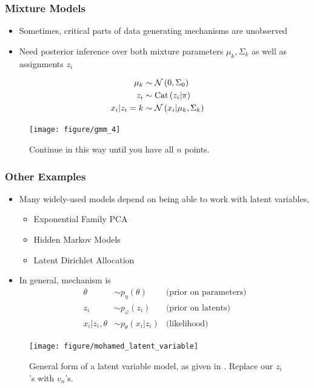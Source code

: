 \documentclass[10pt,mathserif]{beamer}
\begin{document}
\label{sec:latent_variable_models}
\begin{frame}
  \frametitle{Mixture Models}
  \begin{itemize}
  \item Sometimes, critical parts of data generating mechanisms are unobserved
    \item Need posterior inference over both mixture parameters $\mu_k,
      \Sigma_k$ as well as assignments $z_i$
  \end{itemize}
  \begin{align*}
    \mu_{k} &\sim \mathcal{N}\left(0, \Sigma_{0}\right) \\
    z_i &\sim \textnormal{Cat}\left(z_i \vert \pi\right) \\
    x_i \vert z_i = k &\sim \mathcal{N}\left(x_i \vert \mu_{k}, \Sigma_k\right)
  \end{align*}
\begin{figure}[ht]
  \centering
  \texttt{[image: figure/gmm\_4]}
  \caption{Continue in this way until you have all $n$ points. \label{fig:gmm_4}}
\end{figure}
\end{frame}

\begin{frame}
  \frametitle{Other Examples}
  \begin{itemize}
  \item Many widely-used models depend on being able to work with latent variables,
    \begin{itemize}
    \item Exponential Family PCA
    \item Hidden Markov Models
    \item Latent Dirichlet Allocation
    \end{itemize}
    \item In general, mechanism is
      \begin{align*}
        \theta &\sim p_{\eta}\left(\theta\right) &\text{(prior on parameters)} \\
        z_{i} &\sim p_{\varphi}\left(z_{i}\right) &\text{(prior on latents)} \\
        x_{i} \vert z_{i}, \theta &\sim p_{\theta}\left(x_{i} \vert z_{i} \right) &\text{(likelihood)}
      \end{align*}
  \end{itemize}
  \begin{figure}[ht]
    \centering
    \texttt{[image: figure/mohamed\_latent\_variable]}
    \caption{General form of a latent variable model, as given in
      \citep{mohamed2011generalised}. Replace our $z_i$'s with
      $v_n$'s. \label{fig:mohamed_latent_variable} }
  \end{figure}
\end{frame}
\end{document}
